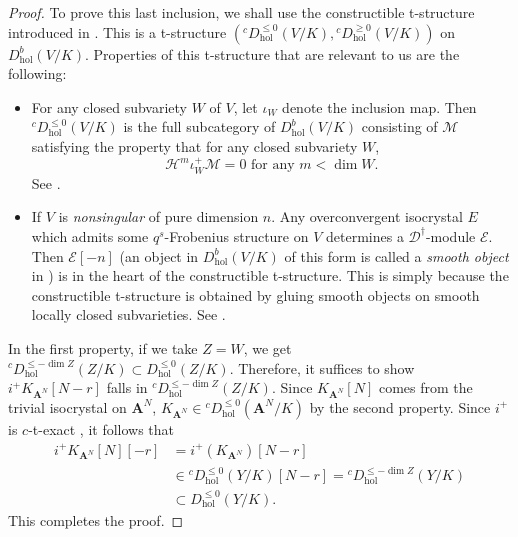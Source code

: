 \documentclass{amsart}
\numberwithin{equation}{section}
\theoremstyle{plain}
\theoremstyle{definition}
\renewcommand{\mathbb}{\mathbf}
\begin{document}
\begin{proof}
To prove this last inclusion, we shall use the constructible
t-structure introduced in
\cite[\S1.3]{abe:langlands-correspondence-for-isocrystals-and-crystalline-companions}.
This is a t-structure
\(({}^{c}D^{\leq0}_{\mathrm{hol}}(V/K),{}^{c}D^{\geq0}_{\mathrm{hol}}(V/K))\)
on \(D^{b}_{\mathrm{hol}}(V/K)\).  Properties of this t-structure that
are relevant to us are the following:
\begin{itemize}
\item For any closed subvariety \(W\) of \(V\), let
\(\iota_{W}\) denote the inclusion map.  Then
\({}^{c}D^{\leq0}_{\mathrm{hol}}(V/K)\) is the full subcategory of
\(D^{b}_{\mathrm{hol}}(V/K)\) consisting of \(\mathcal{M}\) satisfying
the property that for any closed subvariety \(W\),
\begin{equation*}
\mathcal{H}^{m}\iota_{W}^{+}\mathcal{M} = 0 \text{ for any }m < \dim W.
\end{equation*}
See \cite[\S1.3.1]{abe:langlands-correspondence-for-isocrystals-and-crystalline-companions}.

\item If \(V\) is \emph{nonsingular} of pure dimension \(n\).  Any
overconvergent isocrystal \(E\) which admits some \(q^{s}\)-Frobenius
structure on \(V\) determines a \(\mathscr{D}^{\dagger}\)-module
\(\mathcal{E}\).  Then \(\mathcal{E}[-n]\) (an object in
\(D^{b}_{\mathrm{hol}}(V/K)\) of this form is called a \emph{smooth
  object} in
\cite{abe:langlands-correspondence-for-isocrystals-and-crystalline-companions})
is in the heart of the constructible t-structure.  This is simply
because the constructible t-structure is obtained by gluing smooth
objects on smooth locally closed subvarieties.  See
\cite[Proposition~1.3.3]{abe:langlands-correspondence-for-isocrystals-and-crystalline-companions}.
\end{itemize}

In the first property, if we take \(Z = W\), we get
\({}^{c}D^{\leq-\dim Z}_{\mathrm{hol}}(Z/K) \subset D^{\leq0}_{\mathrm{hol}}(Z/K)\).  Therefore, it suffices to show
\(i^{+}K_{\mathbb{A}^N}[N-r]\) falls in
\({}^{c}D^{\leq-\dim Z}_{\mathrm{hol}}(Z/K)\).  Since \(K_{\mathbb{A}^N}[N]\)
comes from the trivial isocrystal on \(\mathbb{A}^{N}\),
\(K_{\mathbb{A}^N} \in {}^{c}D^{\leq0}_{\mathrm{hol}}(\mathbb{A}^{N}/K)\) by the
second property.  Since \(i^{+}\) is \(c\)-t-exact
\cite[Lemma~1.3.2]{abe:langlands-correspondence-for-isocrystals-and-crystalline-companions},
it follows that
\begin{align*}
  i^{+}K_{\mathbb{A}^N}[N][-r]
  &= i^{+}(K_{\mathbb{A}^N})[N-r] \\
  &\in {}^{c}D^{\leq0}_{\mathrm{hol}}(Y/K)[N-r] = {}^{c}D^{\leq-\dim Z}_{\mathrm{hol}}(Y/K) \\
  &\subset D^{\leq0}_{\mathrm{hol}}(Y/K).
\end{align*}
This completes the proof.
\end{proof}
\end{document}
